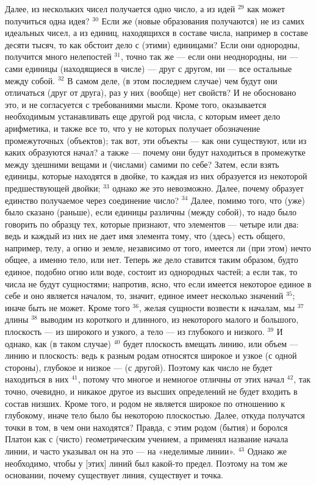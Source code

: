 \documentclass[oneside, 17pt, dvipsnames]{extbook}
\begin{document}
Далее, из нескольких чисел получается одно число, а из идей $^{29}$ как может получиться одна идея? $^{30}$ Если же (новые образования получаются) не из самих идеальных чисел, а из единиц, находящихся в составе числа, например в составе десяти тысяч, то как обстоит дело с (этими) единицами? Если они однородны, получится много нелепостей $^{31}$, точно так же — если они неоднородны, ни — сами единицы (находящиеся в числе) — друг с другом, ни — все остальные между собой. $^{32}$ В самом деле, (в этом последнем случае) чем будут они отличаться (друг от друга), раз у них (вообще) нет свойств? И не обосновано это, и не согласуется с требованиями мысли. Кроме того, оказывается необходимым устанавливать еще другой род числа, с которым имеет дело арифметика, и также все то, что у не которых получает обозначение промежуточных (объектов); так вот, эти объекты — как они существуют, или из каких образуются начал? а также — почему они будут находиться в промежутке между здешними вещами и (числами) самими по себе? Затем, если взять единицы, которые находятся в двойке, то каждая из них образуется из некоторой предшествующей двойки; $^{33}$ однако же это невозможно. Далее, почему образует единство получаемое через соединение число? $^{34}$ Далее, помимо того, что (уже) было сказано (раньше), если единицы различны (между собой), то надо было говорить по образцу тех, которые признают, что элементов — четыре или два: ведь и каждый из них не дает имя элемента тому, что (здесь) есть общего, например, телу, а огню и земле, независимо от того, имеется ли (при этом) нечто общее, а именно тело, или нет. Теперь же дело ставится таким образом, будто единое, подобно огню или воде, состоит из однородных частей; а если так, то числа не будут сущностями; напротив, ясно, что если имеется некоторое единое в себе и оно является началом, то, значит, единое имеет несколько значений $^{35}$; иначе быть не может. Кроме того $^{36}$, желая сущности возвести к началам, мы $^{37}$ длины $^{38}$ выводим из короткого и длинного, из некоторого малого и большого, плоскость — из широкого и узкого, а тело — из глубокого и низкого. $^{39}$ И однако, как (в таком случае) $^{40}$ будет плоскость вмещать линию, или объем — линию и плоскость: ведь к разным родам относятся широкое и узкое (с одной стороны), глубокое и низкое — (с другой). Поэтому как число не будет находиться в них $^{41}$, потому что многое и немногое отличны от этих начал $^{42}$, так точно, очевидно, и никакое другое из высших определений не будет входить в состав низших. Кроме того, и родом не является широкое по отношению к глубокому, иначе тело было бы некоторою плоскостью. Далее, откуда получатся точки в том, в чем они находятся? Правда, с этим родом (бытия) и боролся Платон как с (чисто) геометрическим учением, а применял название начала линии, и часто указывал он на это — на «неделимые линии». $^{43}$ Однако же необходимо, чтобы у [этих] линий был какой-то предел. Поэтому на том же основании, почему существует линия, существует и точка.
\end{document}

